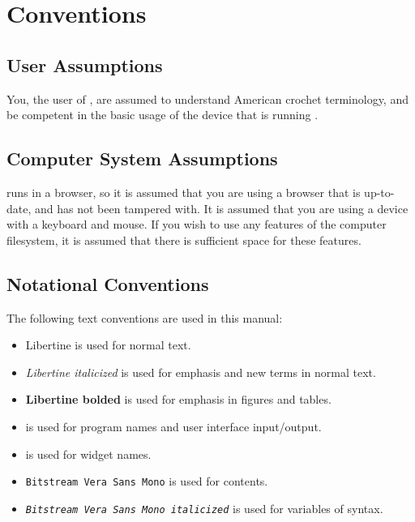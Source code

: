 \documentclass[main.tex]{subfiles}
\begin{document}
\chapter{Conventions}\label{chp:conventions}

\section{User Assumptions}

You, the user of \CC, are assumed to understand American crochet terminology, and be competent in the basic usage of the device that is running \CC.

\section{Computer System Assumptions}\label{sec:csassumptions}

\CC{} runs in a browser, so it is assumed that you are using a browser that is up-to-date, and has not been tampered with. It is assumed that you are using a device with a keyboard and mouse. If you wish to use any features of the computer filesystem, it is assumed that there is sufficient space for these features.

\section{Notational Conventions}

The following text conventions are used in this manual:

\begin{itemize}
\item Libertine is used for normal text.
\item \emph{Libertine italicized} is used for emphasis and new terms in normal text.
\item \textbf{Libertine bolded} is used for emphasis in figures and tables.
\item {} is used for program names and user interface input/output.
\item {} is used for widget names.
\item \Verb`Bitstream Vera Sans Mono` is used for \IR{} contents.
\item \emph{\Verb`Bitstream Vera Sans Mono italicized`} is used for variables of \IR{} syntax.
\end{itemize}
\end{document}
